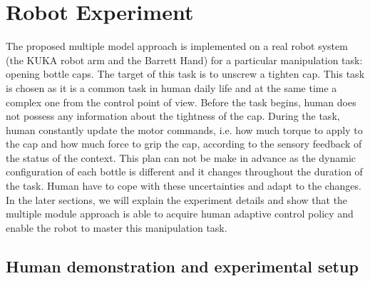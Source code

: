 \section{Robot Experiment}
\label{sec:exp}
The proposed multiple model approach is implemented on a real robot system (the KUKA robot arm and the Barrett Hand) for a particular manipulation task: opening bottle caps. The target of this task is to unscrew a tighten cap.
This task is chosen as it is a common task in human daily life and at the same time a complex one from the control point of view.
Before the task begins, human does not possess any information about the tightness of the cap. During the task, human constantly update the motor commands, i.e. how much torque to apply to the cap and how much force to grip the cap, according to the sensory feedback of the status of the context. This plan can not be make in advance as the dynamic configuration of each bottle is different and it changes throughout the duration of the task. Human have to cope with these uncertainties and adapt to the changes. In the later sections, we will explain the experiment details and show that the multiple module approach is able to acquire human adaptive control policy and enable the robot to master this manipulation task.

\subsection{Human demonstration and experimental setup}
\label{sec:exp_demo}



